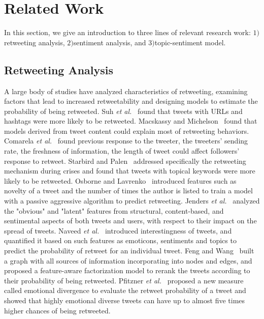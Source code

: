 \documentclass{acm_proc_article-sp}
\begin{document}
\section{Related Work}
\label{relatedwork}
In this section, we give an introduction to three lines of relevant research work: $ 1) $retweeting analysis, $ 2) $sentiment analysis, and $  3)$topic-sentiment model. 
\subsection{Retweeting Analysis}
A large body of studies have analyzed characteristics of retweeting, examining factors that lead to increased retweetability and designing models to estimate the probability of being retweeted. Suh \emph{et al.}~\cite{suh2010want} found that tweets with URLs and hashtags were more likely to be retweeted. 
Macskassy and Michelson~\cite{macskassy2011people} found that models derived from tweet content could explain most of retweeting behaviors.
Comarela \emph{et al.}~\cite{comarela2012understanding} found previous response to the tweeter, the tweeters’ sending rate, the freshness of information, the length of tweet could affect followers’ response to retweet. 
Starbird and Palen~\cite{starbird2012will} addressed specifically the retweeting mechanism during crises and found that tweets with topical keywords were more likely to be retweeted. 
Osborne and Lavrenko~\cite{petrovic2011rt} introduced features such as novelty of a tweet and the number of times the author is listed to train a model with a passive aggressive algorithm to predict retweeting.
Jenders \emph{et al.}~\cite{jenders2013analyzing} analyzed the "obvious" and "latent" features from structural, content-based, and sentimental aspects of both tweets and users, with respect to their impact on the spread of tweets. 
Naveed \emph{et al.}~\cite{naveed2011searching,naveed2011bad} introduced interestingness of tweets, and quantified it based on such features as emoticons, sentiments and topics to predict the probability of retweet for an individual tweet.
Feng and Wang~\cite{feng2013retweet} built a graph with all sources of information incorporating into nodes and edges, and proposed a feature-aware factorization model to rerank the tweets according to their probability of being retweeted.
Pfitzner \emph{et al.}~\cite{pfitzner2012emotional} proposed a new measure called emotional divergence to evaluate the retweet probability of a tweet and showed that highly emotional diverse tweets can have up to almost five times higher chances of being retweeted.
\end{document}
